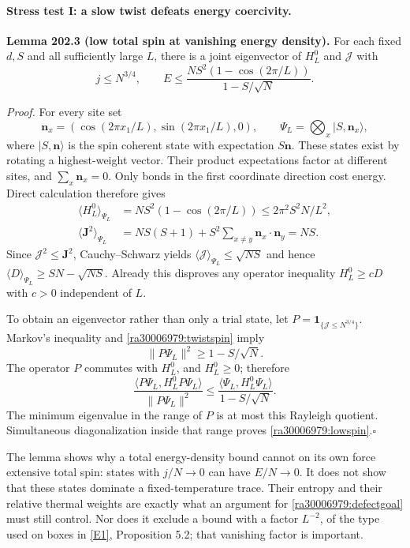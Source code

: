 \documentclass[11pt]{article}
\newcommand{\eref}[2]{\hyperlink{extra:#1:#2}{[E#2]}}
\begin{document}
	\paragraph{Stress test I: a slow twist defeats energy coercivity.}
	\textbf{Lemma 202.3 (low total spin at vanishing energy density).}
	For each fixed $d,S$ and all sufficiently large $L$, there is a joint
	eigenvector of $H_L^0$ and $\mathcal J$ with
	\begin{equation}\label{ra30006979:lowspin}
		j\leq N^{3/4},\qquad
		E\leq\frac{NS^2(1-\cos(2\pi/L))}{1-S/\sqrt N}.
	\end{equation}
	
	\emph{Proof.}
	For every site set
	\[
	\mathbf n_x=(\cos(2\pi x_1/L),\sin(2\pi x_1/L),0),
	\qquad \Psi_L=\bigotimes_x |S,\mathbf n_x\rangle,
	\]
	where $|S,\mathbf n\rangle$ is the spin coherent state with expectation
	$S\mathbf n$. These states exist by rotating a highest-weight vector.
	Their product expectations factor at different sites, and
	$\sum_x\mathbf n_x=0$. Only bonds in the first coordinate direction
	cost energy. Direct calculation therefore gives
	\begin{align}
		\langle H_L^0\rangle_{\Psi_L}
		&=NS^2(1-\cos(2\pi/L))\leq 2\pi^2S^2N/L^2,
		\label{ra30006979:twistenergy}\\
		\langle\mathbf J^2\rangle_{\Psi_L}
		&=NS(S+1)+S^2\sum_{x\ne y}\mathbf n_x\cdot\mathbf n_y=NS.
		\label{ra30006979:twistspin}
	\end{align}
	Since $\mathcal J^2\leq\mathbf J^2$, Cauchy--Schwarz yields
	$\langle\mathcal J\rangle_{\Psi_L}\leq\sqrt{NS}$ and hence
	$\langle D\rangle_{\Psi_L}\geq SN-\sqrt{NS}$.
	Already this disproves any operator inequality $H_L^0\geq cD$ with
	$c>0$ independent of $L$.
	
	To obtain an eigenvector rather than only a trial state, let
	$P=\mathbf1_{\{\mathcal J\leq N^{3/4}\}}$. Markov's inequality and
	\eqref{ra30006979:twistspin} imply
	\[
	\|P\Psi_L\|^2\geq1-S/\sqrt N.
	\]
	The operator $P$ commutes with $H_L^0$, and $H_L^0\geq0$; therefore
	\[
	\frac{\langle P\Psi_L,H_L^0P\Psi_L\rangle}{\|P\Psi_L\|^2}
	\leq\frac{\langle\Psi_L,H_L^0\Psi_L\rangle}{1-S/\sqrt N}.
	\]
	The minimum eigenvalue in the range of $P$ is at most this Rayleigh
	quotient. Simultaneous diagonalization inside that range proves
	\eqref{ra30006979:lowspin}.\hfill$\square$
	
	The lemma shows why a total energy-density bound cannot on its own
	force extensive total spin: states with $j/N\to0$ can have $E/N\to0$.
	It does not show that these states dominate a fixed-temperature trace.
	Their entropy and their relative thermal weights are exactly what an
	argument for \eqref{ra30006979:defectgoal} must still control. Nor does it
	exclude a bound with a factor $L^{-2}$, of the type used on boxes in
	\eref{30006979}{1}, Proposition 5.2; that vanishing factor is important.
	
\end{document}
